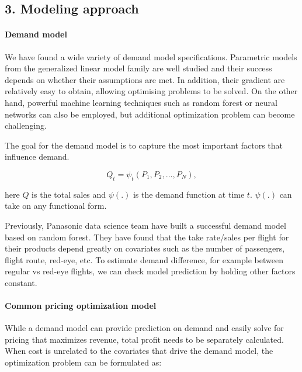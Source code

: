 \documentclass[]{article}
\let\oldparagraph\paragraph
\renewcommand{\paragraph}[1]{\oldparagraph{#1}\mbox{}}
\begin{document}
\pagebreak

\hypertarget{modeling-approach}{%
\subsection{3. Modeling approach}\label{modeling-approach}}

\hypertarget{demand-model}{%
\paragraph{Demand model}\label{demand-model}}

We have found a wide variety of demand model specifications. Parametric
models from the generalized linear model family are well studied and
their success depends on whether their assumptions are met. In addition,
their gradient are relatively easy to obtain, allowing optimising
problems to be solved. On the other hand, powerful machine learning
techniques such as random forest or neural networks can also be
employed, but additional optimization problem can become challenging.

The goal for the demand model is to capture the most important factors
that influence demand.

\[
    Q_t = \psi_t (P_1, P_2, ..., P_N),
\]

here \(Q\) is the total sales and \(\psi(.)\) is the demand function at
time \(t\). \(\psi(.)\) can take on any functional form.

Previously, Panasonic data science team have built a successful demand
model based on random forest. They have found that the take rate/sales
per flight for their products depend greatly on covariates such as the
number of passengers, flight route, red-eye, etc. To estimate demand
difference, for example between regular vs red-eye flights, we can check
model prediction by holding other factors constant.

\hypertarget{common-pricing-optimization-model}{%
\paragraph{Common pricing optimization
model}\label{common-pricing-optimization-model}}

While a demand model can provide prediction on demand and easily solve
for pricing that maximizes revenue, total profit needs to be separately
calculated. When cost is unrelated to the covariates that drive the
demand model, the optimization problem can be formulated as:
\end{document}
